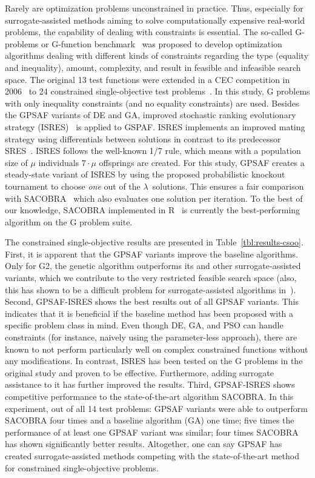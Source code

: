 \documentclass[journal]{IEEEtran}
\begin{document}
Rarely are optimization problems unconstrained in practice. Thus, especially for surrogate-assisted methods aiming to solve computationally expensive real-world problems, the capability of dealing with constraints is essential.
The so-called G-problems or G-function benchmark~\cite{1996-michalewicz-g,1990-floudas-g} was proposed to develop optimization algorithms dealing with different kinds of constraints regarding the type (equality and inequality), amount, complexity, and result in feasible and infeasible search space. The original 13 test functions were extended in a CEC competition in 2006~\cite{2006-cec} to 24 constrained single-objective test problems~\cite{2006-liang-g}. In this study, G problems with only inequality constraints (and no equality constraints) are used.
Besides the GPSAF variants of DE and GA, improved stochastic ranking evolutionary strategy (ISRES)~\cite{2005-runarsson-isres} is applied to GSPAF. ISRES implements an improved mating strategy using differentials between solutions in contrast to its predecessor SRES~\cite{2000-runarsson-stochastic-ranking}.
ISRES follows the well-known 1/7 rule, which means with a population size of $\mu$ individuals $7 \cdot \mu$ offsprings are created. For this study, GPSAF creates a steady-state variant of ISRES by using the proposed probabilistic knockout tournament to choose \emph{one} out of the $\lambda$~solutions. 
This ensures a fair comparison with SACOBRA~\cite{2017-bagheri-sacobra} which also evaluates one solution per iteration. 
To the best of our knowledge, SACOBRA implemented in R~\cite{2020_R} is currently the best-performing algorithm on the G problem suite. 

The constrained single-objective results are presented in Table~\ref{tbl:results-csoo}. First, it is apparent that the GPSAF variants improve the baseline algorithms. Only for G2, the genetic algorithm outperforms its and other surrogate-assisted variants, which we contribute to the very restricted feasible search space (also, this has shown to be a difficult problem for surrogate-assisted algorithms in~\cite{2017-bagheri-sacobra}). 
Second, GPSAF-ISRES shows the best results out of all GPSAF variants. This indicates that it is beneficial if the baseline method has been proposed with a specific problem class in mind. Even though DE, GA, and PSO can handle constraints (for instance, naively using the parameter-less approach), there are known to not perform particularly well on complex constrained functions without any modifications. In contrast, ISRES has been tested on the G problems in the original study and proven to be effective. Furthermore, adding surrogate assistance to it has further improved the results.
Third, GPSAF-ISRES shows competitive performance to the state-of-the-art algorithm SACOBRA. In this experiment, out of all 14 test problems: GPSAF variants were able to outperform SACOBRA four times and a baseline algorithm (GA) one time; five times the performance of at least one GPSAF variant was similar; four times SACOBRA has shown significantly better results.
Altogether, one can say GPSAF has created surrogate-assisted methods competing with the state-of-the-art method for constrained single-objective problems.
\end{document}
